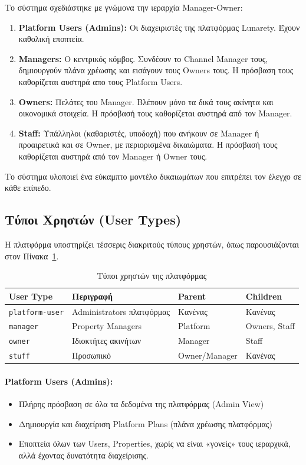 \documentclass[
	12pt, %
	oneside, %
	greek,
	onehalfspacing, %
	liststotoc, %
	toctotoc, %
	parskip, %
	headsepline, %
]{MastersDoctoralThesis} %
\newcommand{\code}[1]{\texttt{#1}}
\begin{document}
Το σύστημα σχεδιάστηκε με γνώμονα την ιεραρχία Manager-Owner:

\begin{enumerate}
    \item \textbf{Platform Users (Admins):} Οι διαχειριστές της πλατφόρμας Lunarety. Έχουν καθολική εποπτεία.
    \item \textbf{Managers:} Ο κεντρικός κόμβος. Συνδέουν το Channel Manager τους, δημιουργούν πλάνα χρέωσης και εισάγουν τους Owners τους. Η πρόσβαση τους καθορίζεται αυστηρά απο τους Platform Users.
    \item \textbf{Owners:} Πελάτες του Manager. Βλέπουν μόνο τα δικά τους ακίνητα και οικονομικά στοιχεία. Η πρόσβασή τους καθορίζεται αυστηρά από τον Manager.
    \item \textbf{Staff:} Υπάλληλοι (καθαριστές, υποδοχή) που ανήκουν σε Manager ή προαιρετικά και σε Owner, με περιορισμένα δικαιώματα. Η πρόσβασή τους καθορίζεται αυστηρά από τον Manager ή Owner τους.
\end{enumerate}

Το σύστημα υλοποιεί ένα εύκαμπτο μοντέλο δικαιωμάτων που επιτρέπει τον έλεγχο σε κάθε επίπεδο.

\subsection{Τύποι Χρηστών (User Types)}
\label{subsec:user-types}

Η πλατφόρμα υποστηρίζει τέσσερις διακριτούς τύπους χρηστών, όπως παρουσιάζονται στον Πίνακα~\ref{tab:user-types}.

\begin{table}[H]
\centering
\caption{Τύποι χρηστών της πλατφόρμας}
\label{tab:user-types}
\begin{tabular}{@{}llll@{}}
\toprule
\textbf{User Type} & \textbf{Περιγραφή} & \textbf{Parent} & \textbf{Children} \\
\midrule
\code{platform-user} & Administrators πλατφόρμας & Κανένας & Κανένας \\
\code{manager} & Property Managers & Platform & Owners, Staff \\
\code{owner} & Ιδιοκτήτες ακινήτων & Manager & Staff \\
\code{stuff} & Προσωπικό & Owner/Manager & Κανένας \\
\bottomrule
\end{tabular}
\end{table}

\paragraph{Platform Users (Admins):}
\begin{itemize}
    \item Πλήρης πρόσβαση σε όλα τα δεδομένα της πλατφόρμας (Admin View)
    \item Δημιουργία και διαχείριση Platform Plans (πλάνα χρέωσης πλατφόρμας)
    \item Εποπτεία όλων των Users, Properties, χωρίς να είναι «γονείς» τους ιεραρχικά, αλλά έχοντας δυνατότητα διαχείρισης.
\end{itemize}
\end{document}
